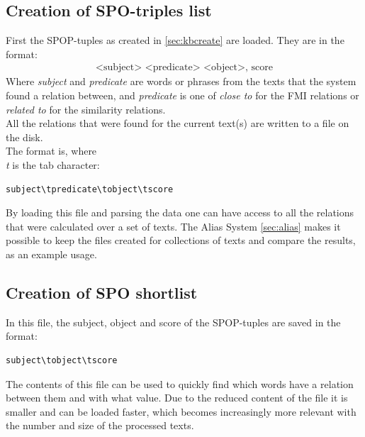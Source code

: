 \subsection{Creation of SPO-triples list}
\label{sec:makerelationlist}
First the SPOP-tuples as created in \ref{sec:kbcreate} are loaded. They are in the format:
\begin{align*}
    \text{<subject> <predicate> <object>, score}
\end{align*}
Where \textit{subject} and \textit{predicate} are words or phrases from the texts that the system found a relation between, and \textit{predicate} is one of \textit{close to} for the FMI relations or \textit{related to} for the similarity relations.\\
All the relations that were found for the current text(s) are written to a file on the disk.\\
The format is, where \textit{\\t} is the tab character:
\begin{lstlisting}
subject\tpredicate\tobject\tscore
\end{lstlisting}
By loading this file and parsing the data one can have access to all the relations that were calculated over a set of texts. The Alias System \ref{sec:alias} makes it possible to keep the files created for collections of texts and compare the results, as an example usage.

\subsection{Creation of SPO shortlist}
\label{makerelationweights}
In this file,  the subject, object and score of the SPOP-tuples are saved in the format:
\begin{lstlisting}
subject\tobject\tscore
\end{lstlisting}
The contents of this file can be used to quickly find which words have a relation between them and with what value. Due to the reduced content of the file it is smaller and can be loaded faster, which becomes increasingly more relevant with the number and size of the processed texts.



